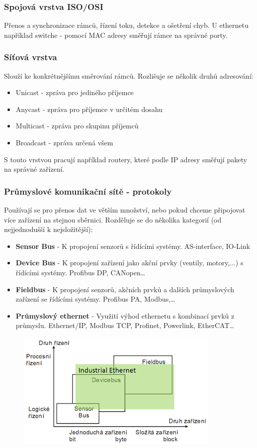 \subsubsection*{Spojová vrstva ISO/OSI}
Přenos a synchronizace rámců, řízení toku, detekce a ošetření chyb. U ethernetu například switche - pomocí MAC adresy směřují rámce na správné porty.

\subsubsection*{Síťová vrstva}
Slouží ke konkrétnějšímu směrování rámců. Rozlišuje se několik druhů adresování:
\begin{itemize}
    \item Unicast - zpráva pro jediného příjemce
    \item Anycast - zpráva pro příjemce v určitém dosahu
    \item Multicast - zpráva pro skupinu příjemců
    \item Broadcast - zpráva určená všem
\end{itemize}
S touto vrstvou pracují například routery, které podle IP adresy směřují pakety na správné zařízení.

\subsubsection*{Průmyslové komunikační sítě - protokoly}
Používají se pro přenos dat ve větším množství, nebo pokud chceme připojovat více zařízení na stejnou sběrnici.
Rozděluje se do několika kategorií (od nejjednodušší k nejsložitější):
\begin{itemize}
    \item \textbf{Sensor Bus} - K propojení senzorů s řídícími systémy. AS-interface, IO-Link
    \item \textbf{Device Bus} - K propojení zařízení jako akční prvky (ventily, motory,...) s řídícími systémy. Profibus DP, CANopen\dots
    \item \textbf{Fieldbus} - K propojení senzorů, akčních prvků a dalších průmyslových zařízení se řídícími systémy. Profibus PA, Modbus,\dots
    \item \textbf{Průmyslový ethernet} - Využití výhod ethernetu s kombinací prvků z průmyslu. Ethernet/IP, Modbus TCP, Profinet, Powerlink, EtherCAT\dots
\end{itemize}

\begin{figure}[h]
    \begin{center}
        \includegraphics[scale = 1]{img/Picture17.png}
    \end{center}
\end{figure}

